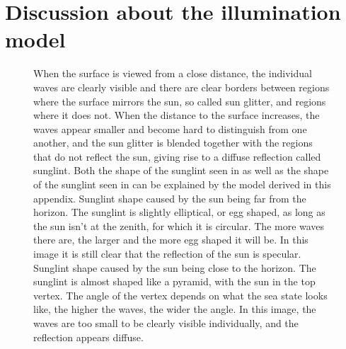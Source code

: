 \section{Discussion about the illumination model}

\begin{figure}
    \centering
    \caption{When the surface is viewed from a close distance, the individual waves are clearly visible and there are clear borders between regions where the surface mirrors the sun, so called sun glitter, and regions where it does not. When the distance to the surface increases, the waves appear smaller and become hard to distinguish from one another, and the sun glitter is blended together with the regions that do not reflect the sun, giving rise to a diffuse reflection called sunglint. Both the shape of the sunglint seen in  as well as the shape of the sunglint seen in  can be explained by the model derived in this appendix.
     Sunglint shape caused by the sun being far from the horizon. The sunglint is slightly elliptical, or egg shaped, as long as the sun isn't at the zenith, for which it is circular. The more waves there are, the larger and the more egg shaped it will be. In this image it is still clear that the reflection of the sun is specular.
     Sunglint shape caused by the sun being close to the horizon. The sunglint is almost shaped like a pyramid, with the sun in the top vertex. The angle of the vertex depends on what the sea state looks like, the higher the waves, the wider the angle. In this image, the waves are too small to be clearly visible individually, and the reflection appears diffuse.
    }
    \label{fig:sunglints}
\end{figure}

